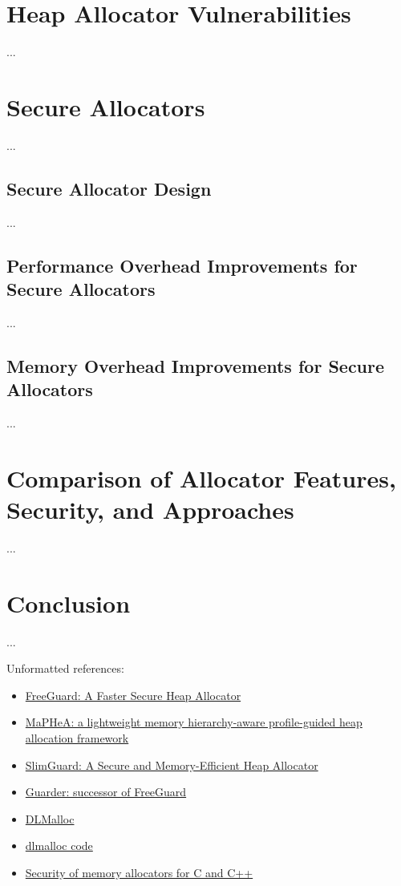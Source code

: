 \documentclass[conference]{IEEEtran}
\begin{document}
\section{Heap Allocator Vulnerabilities}
 {\color{red}...}

\section{Secure Allocators}
 {\color{red}...}

\subsection{Secure Allocator Design}
{\color{red}...}

\subsection{Performance Overhead Improvements for Secure Allocators}
{\color{red}...}

\subsection{Memory Overhead Improvements for Secure Allocators}
{\color{red}...}

\section{Comparison of Allocator Features, Security, and Approaches}
 {\color{red}...}

\section{Conclusion}
 {\color{red}...}


\color{red}

Unformatted references:

\begin{itemize}
	\item \href{https://dl.acm.org/doi/10.1145/3133956.3133957}{FreeGuard: A Faster Secure Heap Allocator}
	\item \href{https://dl.acm.org/doi/10.1145/3461648.3463844}{MaPHeA: a lightweight memory hierarchy-aware profile-guided heap allocation framework}
	\item \href{https://dl.acm.org/doi/10.1145/3361525.3361532}{SlimGuard: A Secure and Memory-Efficient Heap Allocator}
	\item \href{https://www.usenix.org/conference/usenixsecurity18/presentation/silvestro}{Guarder: successor of FreeGuard}
	\item \href{http://gee.cs.oswego.edu/dl/html/malloc.html}{DLMalloc}
	\item \href{https://github.com/ennorehling/dlmalloc/blob/master/malloc.c}{dlmalloc code}
	\item \href{https://www.researchgate.net/profile/Yves-Younan-2/publication/244152148_Security_of_memory_allocators_for_C_and_C/links/569828ef08aea2d74375eabf/Security-of-memory-allocators-for-C-and-C.pdf}{Security of memory allocators for C and C++}
\end{itemize}
\end{document}
